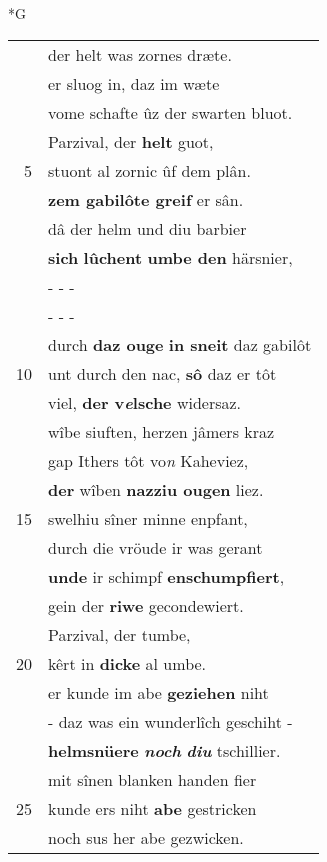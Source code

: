 \documentclass[8pt,a4paper,notitlepage]{article}
\begin{document}
\newpage
\begin{table}[ht]
\begin{minipage}[t]{0.5\linewidth}
\small
\begin{center}*G
\end{center}
\begin{tabular}{rl}
 & der helt was zornes dræte.\\ 
 & er sluog in, daz im wæte\\ 
 & vome schafte ûz der swarten bluot.\\ 
 & Parzival, der \textbf{helt} guot,\\ 
5 & stuont al zornic ûf dem plân.\\ 
 & \textbf{zem gabilôte greif} er sân.\\ 
 & dâ der helm und diu barbier\\ 
 & \textbf{sich} \textbf{lûchent} \textbf{umbe den} härsnier,\\ 
 & \multicolumn{1}{l}{ - - - }\\ 
 & \multicolumn{1}{l}{ - - - }\\ 
 & durch \textbf{daz ouge} \textbf{in sneit} daz gabilôt\\ 
10 & unt durch den nac, \textbf{sô} daz er tôt\\ 
 & viel, \textbf{der v\textit{e}lsche} widersaz.\\ 
 & wîbe siuften, herzen jâmers kraz\\ 
 & gap Ithers tôt vo\textit{n} Kaheviez,\\ 
 & \textbf{der} wîben \textbf{nazziu ougen} liez.\\ 
15 & swelhiu sîner minne enpfant,\\ 
 & durch die vröude ir was gerant\\ 
 & \textbf{unde} ir schimpf \textbf{enschumpfiert},\\ 
 & gein der \textbf{riwe} gecondewiert.\\ 
 & Parzival, der tumbe,\\ 
20 & kêrt in \textbf{dicke} al umbe.\\ 
 & er kunde im abe \textbf{geziehen} niht\\ 
 & - daz was ein wunderlîch geschiht -\\ 
 & \textbf{helmsnüere} \textit{\textbf{noch}} \textit{\textbf{diu}} tschillier.\\ 
 & mit sînen blanken handen fier\\ 
25 & kunde ers niht \textbf{abe} gestricken\\ 
 & noch sus her abe gezwicken.\\ 

\end{tabular}
\end{minipage}
\end{table}
\end{document}
